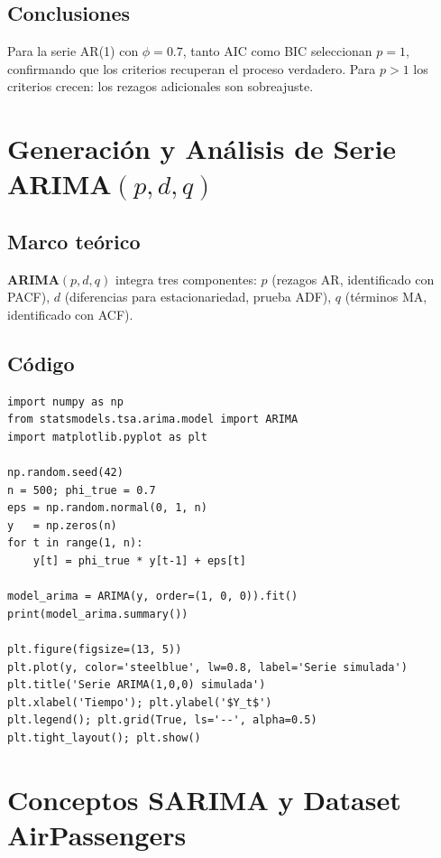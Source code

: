 \documentclass[12pt,letterpaper]{article}
\begin{document}
\subsection{Conclusiones}

Para la serie AR(1) con $\phi=0.7$, tanto AIC como BIC seleccionan $p=1$,
confirmando que los criterios recuperan el proceso verdadero. Para $p>1$
los criterios crecen: los rezagos adicionales son sobreajuste.

\section{Generaci\'on y An\'alisis de Serie ARIMA$(p,d,q)$}

\subsection{Marco te\'orico}

\textbf{ARIMA$(p,d,q)$} integra tres componentes:
$p$ (rezagos AR, identificado con PACF),
$d$ (diferencias para estacionariedad, prueba ADF),
$q$ (t\'erminos MA, identificado con ACF).

\subsection{C\'odigo}

\begin{lstlisting}[style=python, caption={Simulaci\'on y ajuste ARIMA(1,0,0)}]
import numpy as np
from statsmodels.tsa.arima.model import ARIMA
import matplotlib.pyplot as plt

np.random.seed(42)
n = 500; phi_true = 0.7
eps = np.random.normal(0, 1, n)
y   = np.zeros(n)
for t in range(1, n):
    y[t] = phi_true * y[t-1] + eps[t]

model_arima = ARIMA(y, order=(1, 0, 0)).fit()
print(model_arima.summary())

plt.figure(figsize=(13, 5))
plt.plot(y, color='steelblue', lw=0.8, label='Serie simulada')
plt.title('Serie ARIMA(1,0,0) simulada')
plt.xlabel('Tiempo'); plt.ylabel('$Y_t$')
plt.legend(); plt.grid(True, ls='--', alpha=0.5)
plt.tight_layout(); plt.show()
\end{lstlisting}

\section{Conceptos SARIMA y Dataset AirPassengers}
\end{document}
